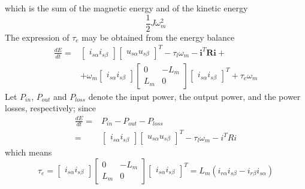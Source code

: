 \documentclass[11pt,a4paper,oneside]{book}
\numberwithin{equation}{section}
\theoremstyle{it}
\theoremstyle{definition}
\begin{document}
which is the sum of the magnetic energy and of the kinetic energy
\begin{equation}\label{eq44}
	\frac{1}{2}J\omega_m^2
\end{equation}
The expression of $\tau_e$ may be obtained from the energy balance
\begin{equation}\label{eq45}
	\begin{split}
		\frac{dE}{dt} = &
		\left[\begin{matrix}
			i_{s\alpha} i_{s\beta}
		\end{matrix}\right]
		\left[\begin{matrix}
			u_{s\alpha} u_{s\beta}
		\end{matrix}\right]^T -\tau_l\omega_m-\mathbf{i}^T\mathbf{R}\mathbf{i} + \\[6pt]
		& + \omega_m
		\left[\begin{matrix}
			i_{s\alpha} i_{s\beta}
		\end{matrix}\right]
		\left[\begin{matrix}
			0 & -L_m \\
			L_m & 0
		\end{matrix}\right]
		\left[\begin{matrix}
			i_{s\alpha} i_{s\beta}
		\end{matrix}\right]^T
		+\tau_e\omega_m
	\end{split}
\end{equation}
Let $P_{in}$, $P_{out}$ and $P_{loss}$ denote the input power, the output power, and the power losses, respectively; since
\begin{equation}\label{eq46}
	\begin{split}
		\frac{dE}{dt} = & P_{in} - P_{out} -P_{loss} \\[6pt]
		= &
		\left[\begin{matrix}
			i_{s\alpha} i_{s\beta}
		\end{matrix}\right]
		\left[\begin{matrix}
			u_{s\alpha} u_{s\beta}
		\end{matrix}\right]^T -\tau_l\omega_m-i^TRi
	\end{split}
\end{equation}
which means 
\begin{equation}\label{eq47}
	\tau_e = 
	\left[\begin{matrix}
		i_{s\alpha} i_{s\beta}
	\end{matrix}\right]
	\left[\begin{matrix}
		0 & -L_m \\
		L_m & 0
	\end{matrix}\right]
	\left[\begin{matrix}
		i_{s\alpha} i_{s\beta}
	\end{matrix}\right]^T = 
	L_m\left(i_{r\alpha} i_{s\beta} - i_{r\beta} i_{s\alpha}\right)
\end{equation}
\end{document}
